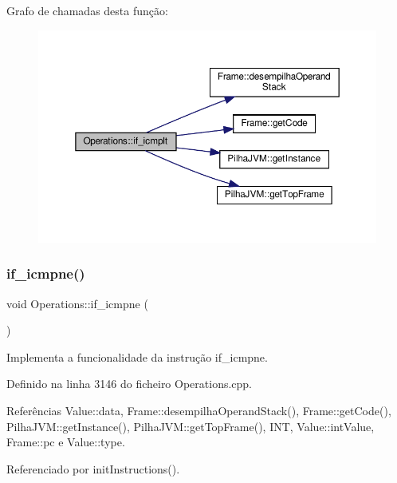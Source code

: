 Grafo de chamadas desta função\+:\nopagebreak
\begin{figure}[H]
\begin{center}
\leavevmode
\includegraphics[width=350pt]{classOperations_a06f624059cfada3f4a726d0482078aaa_cgraph}
\end{center}
\end{figure}
\mbox{\label{classOperations_a52dca630766e37bbaf0e7439c0335273}} 
\subsubsection{\texorpdfstring{if\+\_\+icmpne()}{if\_icmpne()}}
{\footnotesize\ttfamily void Operations\+::if\+\_\+icmpne (\begin{DoxyParamCaption}{ }\end{DoxyParamCaption})\hspace{0.3cm}{\ttfamily [private]}}



Implementa a funcionalidade da instrução if\+\_\+icmpne. 



Definido na linha 3146 do ficheiro Operations.\+cpp.



Referências Value\+::data, Frame\+::desempilha\+Operand\+Stack(), Frame\+::get\+Code(), Pilha\+J\+V\+M\+::get\+Instance(), Pilha\+J\+V\+M\+::get\+Top\+Frame(), I\+NT, Value\+::int\+Value, Frame\+::pc e Value\+::type.



Referenciado por init\+Instructions().

